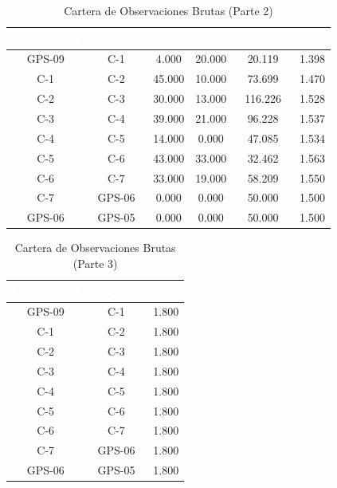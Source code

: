\documentclass[11pt,letterpaper]{article}
\begin{document}
\begin{table}[H]
  \centering
  \small
  \caption{Cartera de Observaciones Brutas (Parte 2)}
  \label{tab:campo_1}
  \begin{tabular}{|c|c|c|c|c|c|}
    \hline
    \rowcolor{GeoBlue}
    \textcolor{white}{\textbf{Estacionado}} & \textcolor{white}{\textbf{Pto\_Obs}} & \textcolor{white}{\textbf{Z\_M}} & \textcolor{white}{\textbf{Z\_S}} & \textcolor{white}{\textbf{Dist\_Inc}} & \textcolor{white}{\textbf{hi}} \\
    \hline
    \rowcolor{GeoBlue!5}
    GPS-09 & C-1 & 4.000 & 20.000 & 20.119 & 1.398 \\
    \hline
    \rowcolor{white}
    C-1 & C-2 & 45.000 & 10.000 & 73.699 & 1.470 \\
    \hline
    \rowcolor{GeoBlue!5}
    C-2 & C-3 & 30.000 & 13.000 & 116.226 & 1.528 \\
    \hline
    \rowcolor{white}
    C-3 & C-4 & 39.000 & 21.000 & 96.228 & 1.537 \\
    \hline
    \rowcolor{GeoBlue!5}
    C-4 & C-5 & 14.000 & 0.000 & 47.085 & 1.534 \\
    \hline
    \rowcolor{white}
    C-5 & C-6 & 43.000 & 33.000 & 32.462 & 1.563 \\
    \hline
    \rowcolor{GeoBlue!5}
    C-6 & C-7 & 33.000 & 19.000 & 58.209 & 1.550 \\
    \hline
    \rowcolor{white}
    C-7 & GPS-06 & 0.000 & 0.000 & 50.000 & 1.500 \\
    \hline
    \rowcolor{GeoBlue!5}
    GPS-06 & GPS-05 & 0.000 & 0.000 & 50.000 & 1.500 \\
    \hline
  \end{tabular}
\end{table}
\vspace{0.8cm}
\begin{table}[H]
  \centering
  \small
  \caption{Cartera de Observaciones Brutas (Parte 3)}
  \label{tab:campo_2}
  \begin{tabular}{|c|c|c|}
    \hline
    \rowcolor{GeoBlue}
    \textcolor{white}{\textbf{Estacionado}} & \textcolor{white}{\textbf{Pto\_Obs}} & \textcolor{white}{\textbf{hr}} \\
    \hline
    \rowcolor{GeoBlue!5}
    GPS-09 & C-1 & 1.800 \\
    \hline
    \rowcolor{white}
    C-1 & C-2 & 1.800 \\
    \hline
    \rowcolor{GeoBlue!5}
    C-2 & C-3 & 1.800 \\
    \hline
    \rowcolor{white}
    C-3 & C-4 & 1.800 \\
    \hline
    \rowcolor{GeoBlue!5}
    C-4 & C-5 & 1.800 \\
    \hline
    \rowcolor{white}
    C-5 & C-6 & 1.800 \\
    \hline
    \rowcolor{GeoBlue!5}
    C-6 & C-7 & 1.800 \\
    \hline
    \rowcolor{white}
    C-7 & GPS-06 & 1.800 \\
    \hline
    \rowcolor{GeoBlue!5}
    GPS-06 & GPS-05 & 1.800 \\
    \hline
  \end{tabular}
\end{table}
\vspace{0.8cm}
\end{document}
